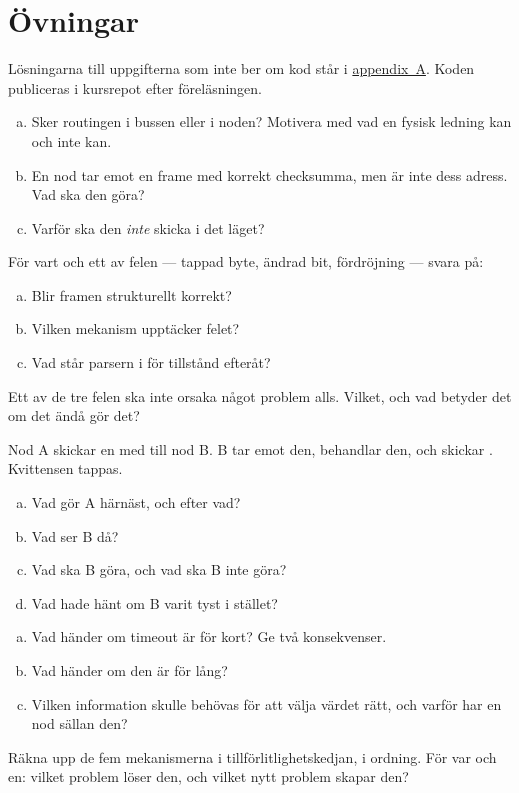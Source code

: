\section*{Övningar}

Lösningarna till uppgifterna som inte ber om kod står i \hyperref[ch:losningar]{appendix~A}.
Koden publiceras i kursrepot efter föreläsningen.

\label{ex:3:1}
\begin{enumerate}[a)]
  \item Sker routingen i bussen eller i noden? Motivera med vad en fysisk ledning kan och inte kan.
  \item En nod tar emot en frame med korrekt checksumma, men  är inte dess adress. Vad
    ska den göra?
  \item Varför ska den \emph{inte} skicka  i det läget?
\end{enumerate}

\label{ex:3:2}
För vart och ett av felen --- tappad byte, ändrad bit, fördröjning --- svara på:
\begin{enumerate}[a)]
  \item Blir framen strukturellt korrekt?
  \item Vilken mekanism upptäcker felet?
  \item Vad står parsern i för tillstånd efteråt?
\end{enumerate}
Ett av de tre felen ska inte orsaka något problem alls. Vilket, och vad betyder det om det ändå
gör det?

\label{ex:3:3}
Nod A skickar en  med  till nod B. B tar emot den, behandlar
den, och skickar . Kvittensen tappas.
\begin{enumerate}[a)]
  \item Vad gör A härnäst, och efter vad?
  \item Vad ser B då?
  \item Vad ska B göra, och vad ska B inte göra?
  \item Vad hade hänt om B varit tyst i stället?
\end{enumerate}

\label{ex:3:4}
\begin{enumerate}[a)]
  \item Vad händer om timeout är för kort? Ge två konsekvenser.
  \item Vad händer om den är för lång?
  \item Vilken information skulle behövas för att välja värdet rätt, och varför har en nod
    sällan den?
\end{enumerate}

\label{ex:3:5}
Räkna upp de fem mekanismerna i tillförlitlighetskedjan, i ordning. För var och en: vilket problem
löser den, och vilket nytt problem skapar den?

